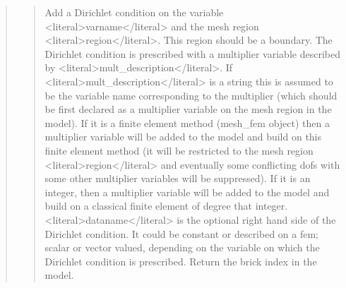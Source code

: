\documentclass[a4paper,11pt,english]{sphinxmanual}
\begin{document}
\begin{quote}
\begin{quote}
\sphinxAtStartPar
Add a Dirichlet condition on the variable \textless{}literal\textgreater{}varname\textless{}/literal\textgreater{} and the mesh
region \textless{}literal\textgreater{}region\textless{}/literal\textgreater{}. This region should be a boundary. The Dirichlet
condition is prescribed with a multiplier variable described by
\textless{}literal\textgreater{}mult\_description\textless{}/literal\textgreater{}. If \textless{}literal\textgreater{}mult\_description\textless{}/literal\textgreater{} is a string this is assumed
to be the variable name corresponding to the multiplier (which should be
first declared as a multiplier variable on the mesh region in the model).
If it is a finite element method (mesh\_fem object) then a multiplier
variable will be added to the model and build on this finite element
method (it will be restricted to the mesh region \textless{}literal\textgreater{}region\textless{}/literal\textgreater{} and eventually
some conflicting dofs with some other multiplier variables will be
suppressed). If it is an integer, then a  multiplier variable will be
added to the model and build on a classical finite element of degree
that integer. \textless{}literal\textgreater{}dataname\textless{}/literal\textgreater{} is the optional right hand side of  the
Dirichlet condition. It could be constant or described on a fem; scalar
or vector valued, depending on the variable on which the Dirichlet
condition is prescribed. Return the brick index in the model.
\end{quote}

\sphinxAtStartPar
{}
\begin{quote}


\end{quote}
\end{quote}
\end{document}
